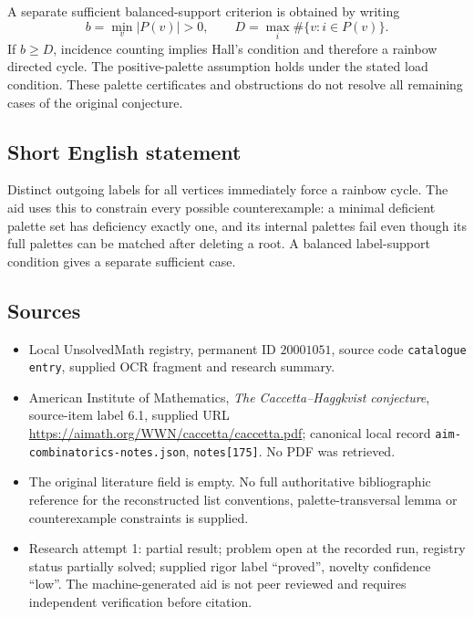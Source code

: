 \documentclass[11pt]{article}
\begin{document}
A separate sufficient balanced-support criterion is obtained by writing
\[
 b=\min_v|P(v)|>0,\qquad
 D=\max_i\#\{v:i\in P(v)\}.
\]
If $b\geq D$, incidence counting implies Hall's condition and therefore a rainbow directed cycle. The positive-palette assumption holds under the stated load condition. These palette certificates and obstructions do not resolve all remaining cases of the original conjecture.
\subsection{Short English statement}
Distinct outgoing labels for all vertices immediately force a rainbow cycle. The aid uses this to constrain every possible counterexample: a minimal deficient palette set has deficiency exactly one, and its internal palettes fail even though its full palettes can be matched after deleting a root. A balanced label-support condition gives a separate sufficient case.
\subsection{Sources}
\begin{itemize}
\item Local UnsolvedMath registry, permanent ID $20001051$, source code \texttt{catalogue entry}, supplied OCR fragment and research summary.
\item American Institute of Mathematics, \emph{The Caccetta--Haggkvist conjecture}, source-item label 6.1, supplied URL \url{https://aimath.org/WWN/caccetta/caccetta.pdf}; canonical local record \texttt{aim-combinatorics-notes.json}, \texttt{notes[175]}. No PDF was retrieved.
\item The original literature field is empty. No full authoritative bibliographic reference for the reconstructed list conventions, palette-transversal lemma or counterexample constraints is supplied.
\item Research attempt 1: partial result; problem open at the recorded run, registry status partially solved; supplied rigor label ``proved'', novelty confidence ``low''. The machine-generated aid is not peer reviewed and requires independent verification before citation.
\end{itemize}
\end{document}
